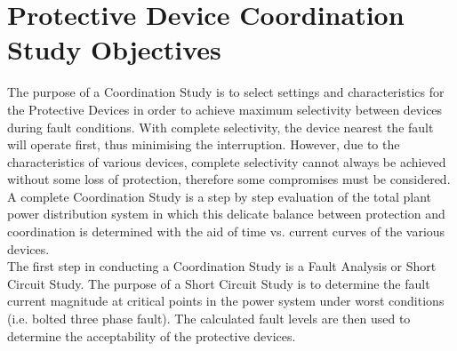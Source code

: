 \section{Protective Device Coordination Study Objectives}
\label{af:pdco}

\noindent The purpose of a Coordination Study is to select settings and characteristics for the
Protective Devices in order to achieve maximum selectivity between devices during
fault conditions. With complete selectivity, the device nearest the fault will operate first,
thus minimising the interruption. However, due to the characteristics of various devices,
complete selectivity cannot always be achieved without some loss of protection,
therefore some compromises must be considered.\\

\noindent A complete Coordination Study is a step by step evaluation of the total plant power
distribution system in which this delicate balance between protection and coordination is
determined with the aid of time vs. current curves of the various devices.\\

\noindent The first step in conducting a Coordination Study is a Fault Analysis or Short Circuit
Study. The purpose of a Short Circuit Study is to determine the fault current magnitude
at critical points in the power system under worst conditions (i.e. bolted three phase
fault). The calculated fault levels are then used to determine the acceptability of the
protective devices.